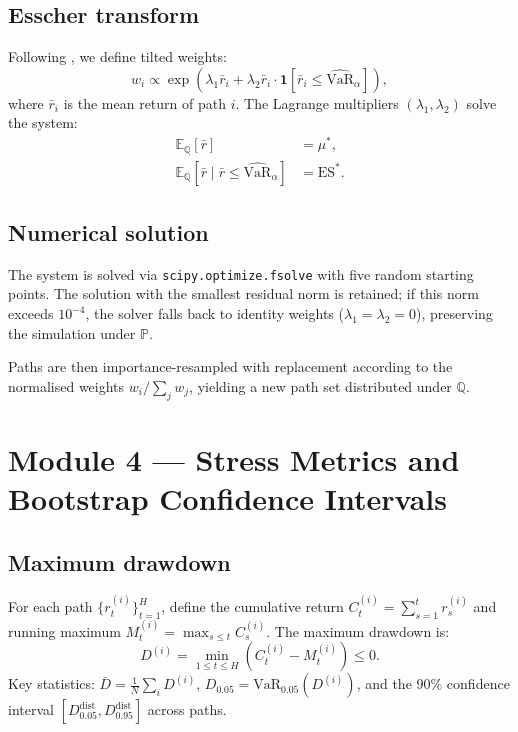 \documentclass[12pt]{article}
\newcommand{\E}{\mathbb{E}}
\newcommand{\Q}{\mathbb{Q}}
\newcommand{\P}{\mathbb{P}}
\begin{document}
\subsection{Esscher transform}

Following \citet{GerberShiu1994}, we define tilted weights:
\begin{equation}
  w_i \propto \exp\!\left(\lambda_1 \bar r_i
    + \lambda_2 \bar r_i \cdot \mathbf{1}[\bar r_i \leq \widehat{\text{VaR}}_\alpha]\right),
\end{equation}
where $\bar r_i$ is the mean return of path $i$.
The Lagrange multipliers $(\lambda_1, \lambda_2)$ solve the system:
\begin{align}
  \E_\Q[\bar r] &= \mu^*, \\
  \E_\Q[\bar r \mid \bar r \leq \widehat{\text{VaR}}_\alpha] &= \text{ES}^*.
\end{align}

\subsection{Numerical solution}

The system is solved via \texttt{scipy.optimize.fsolve} with five
random starting points.  The solution with the smallest residual
norm is retained; if this norm exceeds $10^{-4}$, the solver falls
back to identity weights ($\lambda_1 = \lambda_2 = 0$), preserving
the simulation under $\P$.

Paths are then importance-resampled with replacement according to
the normalised weights $w_i / \sum_j w_j$, yielding a new path set
distributed under $\Q$.

\section{Module 4 — Stress Metrics and Bootstrap Confidence Intervals}

\subsection{Maximum drawdown}

For each path $\{r_t^{(i)}\}_{t=1}^H$, define the cumulative return
$C_t^{(i)} = \sum_{s=1}^t r_s^{(i)}$ and running maximum
$M_t^{(i)} = \max_{s \leq t} C_s^{(i)}$.  The maximum drawdown is:
\begin{equation}
  D^{(i)} = \min_{1 \leq t \leq H}\left(C_t^{(i)} - M_t^{(i)}\right) \leq 0.
\end{equation}
Key statistics: $\bar D = \frac{1}{N}\sum_i D^{(i)}$,
$D_{0.05} = \text{VaR}_{0.05}(D^{(i)})$, and the 90\% confidence
interval $[D_{0.05}^{\text{dist}}, D_{0.95}^{\text{dist}}]$ across paths.
\end{document}
